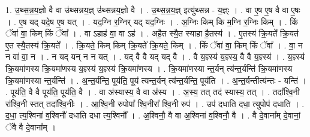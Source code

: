 \documentclass[17pt]{extarticle}
\begin{document}
1. उ॒थ्स॒न्न॒य॒ज्ञो वै वा उ॑थ्सन्नय॒ज्ञ् उ॑थ्सन्नय॒ज्ञो वै । . उ॒थ्स॒न्न॒य॒ज्ञ् इत्यु॑थ्सन्न - य॒ज्ञ्ः । . वा ए॒ष ए॒ष वै वा ए॒षः । . ए॒ष यद् यदे॒ष ए॒ष यत् । . यद॒ग्नि र॒ग्निर् यद् यद॒ग्निः । . अ॒ग्निः किम् कि म॒ग्नि र॒ग्निः किम् । . किं ॅवा॑ वा॒ किम् किं ॅवा᳚ । . वा ऽहाह॑ वा॒ वा ऽह॑ । . अहै॒त स्यै॒त स्याहा है॒तस्य॑ । . ए॒तस्य॑ क्रि॒यते᳚ क्रि॒यत॑ ए॒त स्यै॒तस्य॑ क्रि॒यते᳚ । . क्रि॒यते॒ किम् किम् क्रि॒यते᳚ क्रि॒यते॒ किम् । . किं ॅवा॑ वा॒ किम् किं ॅवा᳚ । . वा॒ न न वा॑ वा॒ न । . न यद् यन् न न यत् । . यद् वै वै यद् यद् वै । . वै य॒ज्ञ्स्य॑ य॒ज्ञ्स्य॒ वै वै य॒ज्ञ्स्य॑ । . य॒ज्ञ्स्य॑ क्रि॒यमा॑णस्य क्रि॒यमा॑णस्य य॒ज्ञ्स्य॑ य॒ज्ञ्स्य॑ क्रि॒यमा॑णस्य । . क्रि॒यमा॑णस्या न्त॒र्यन् त्य॑न्त॒र्यन्ति॑ क्रि॒यमा॑णस्य क्रि॒यमा॑णस्या न्त॒र्यन्ति॑ । . अ॒न्त॒र्यन्ति॒ पूय॑ति॒ पूय॑ त्यन्त॒र्यन् त्य॑न्त॒र्यन्ति॒ पूय॑ति । . अ॒न्त॒र्यन्तीत्य॑न्तः - यन्ति॑ । . पूय॑ति॒ वै वै पूय॑ति॒ पूय॑ति॒ वै । . वा अ॑स्यास्य॒ वै वा अ॑स्य । . अ॒स्य॒ तत् तद॑ स्यास्य॒ तत् । . तदा᳚श्वि॒नी रा᳚श्वि॒नी स्तत् तदा᳚श्वि॒नीः । . आ॒श्वि॒नी रुपोपा᳚ श्वि॒नीरा᳚ श्वि॒नी रुप॑ । . उप॑ दधाति दधा॒ त्युपोप॑ दधाति । . द॒धा॒ त्य॒श्विना॑ व॒श्विनौ॑ दधाति दधा त्य॒श्विनौ᳚ । . अ॒श्विनौ॒ वै वा अ॒श्विना॑ व॒श्विनौ॒ वै । . वै दे॒वाना᳚म् दे॒वानां॒ ॅवै वै दे॒वाना᳚म् । \newline
\end{document}
